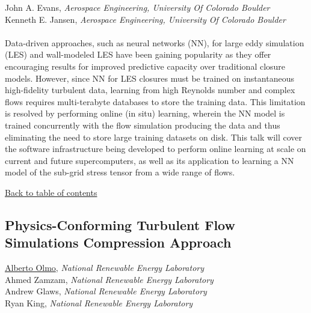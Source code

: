 {John A. Evans}, \textit{Aerospace Engineering, University Of Colorado Boulder}\\ 
{Kenneth E. Jansen}, \textit{Aerospace Engineering, University Of Colorado Boulder}\\ 
\vspace{-0.1 in} \\ 
\noindent Data-driven approaches, such as neural networks (NN), for large eddy simulation (LES) and wall-modeled LES have been gaining popularity as they offer encouraging results for improved predictive capacity over traditional closure models. However, since NN for LES closures must be trained on instantaneous high-fidelity turbulent data, learning from high Reynolds number and complex flows requires multi-terabyte databases to store the training data. This limitation is resolved by performing online (in situ) learning, wherein the NN model is trained concurrently with the flow simulation producing the data and thus eliminating the need to store large training datasets on disk. This talk will cover the software infrastructure being developed to perform online learning at scale on current and future supercomputers, as well as its application to learning a NN model of the sub-grid stress tensor from a wide range of flows. \\ 
\begin{flushright}\vspace{-0.2 in}\hyperlink{toc}{Back to table of contents}\end{flushright}\vspace{-0.2 in}
\hypertarget{AlbertoOlmo}{\subsection*{\color{CUGOLD} Physics-Conforming Turbulent Flow Simulations Compression Approach}} \vsp 
\underline{Alberto Olmo}, \textit{National Renewable Energy Laboratory}\\ 
{Ahmed Zamzam}, \textit{National Renewable Energy Laboratory}\\ 
{Andrew Glaws}, \textit{National Renewable Energy Laboratory}\\ 
{Ryan King}, \textit{National Renewable Energy Laboratory}\\ 
\vspace{-0.1 in} \\ 

